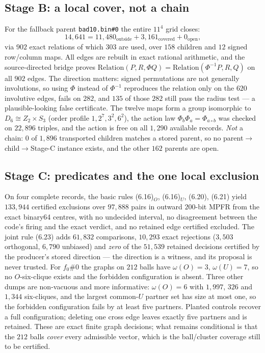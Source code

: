 \documentclass[10pt]{article}
\theoremstyle{definition}
\begin{document}
\subsection{Stage B: a local cover, not a chain}
For the fallback parent \texttt{bad10.bin\#0} the entire $11^4$ grid closes:
\[
14{,}641=11{,}480_{\text{outside}}+3{,}161_{\text{covered}}+0_{\text{open}} ,
\]
via $902$ exact relations of which $303$ are used, over $158$ children and $12$ signed row/column
maps. All edges are rebuilt in exact rational arithmetic, and the source-directed bridge proves
$\mathrm{Relation}(P,R,\Phi Q)=\mathrm{Relation}(\Phi^{-1}P,R,Q)$ on all $902$ edges. The direction
matters: signed permutations are not generally involutions, so using $\Phi$ instead of $\Phi^{-1}$
reproduces the relation only on the $620$ involutive edges, fails on $282$, and $135$ of those $282$
still pass the radius test --- a plausible-looking false certificate. The twelve maps form a group
isomorphic to $D_6\cong Z_2\times S_3$ (order profile $1,2^7,3^2,6^2$), the action law
$\Phi_b\Phi_a=\Phi_{a\circ b}$ was checked on $22{,}896$ triples, and the action is free on all
$1{,}290$ available records. \emph{Not} a chain: $0$ of $1{,}896$ transported children matches a stored
parent, so no parent$\to$child$\to$Stage-C instance exists, and the other $162$ parents are open.

\subsection{Stage C: predicates and the one local exclusion}
On four complete records, the basic rules (6.16)$_O$, (6.16)$_U$, (6.20), (6.21) yield $133{,}944$
certified exclusions over $97{,}888$ pairs in outward $200$-bit MPFR from the exact binary64
centres, with no undecided interval, no disagreement between the code's firing and the exact verdict,
and no retained edge certified excluded. The joint rule (6.23) adds $61{,}832$ comparisons,
$10{,}293$ exact rejections ($3{,}503$ orthogonal, $6{,}790$ unbiased) and \emph{zero} of the
$51{,}539$ retained decisions certified by the producer's stored direction --- the direction is a
witness, and its proposal is never trusted. For $f_0\#0$ the graphs on $212$ balls have
$\omega(O)=3$, $\omega(U)=7$, so no $O$-six-clique exists and the forbidden configuration is absent.
Three other dumps are non-vacuous and more informative: $\omega(O)=6$ with $1{,}997$, $326$ and
$1{,}344$ six-cliques, and the largest common-$U$ partner set has size at most one, so the forbidden
configuration fails by at least five partners. Planted controls recover a full configuration; deleting
one cross edge leaves exactly five partners and is retained. These are exact finite graph decisions;
what remains conditional is that the $212$ balls \emph{cover} every admissible vector, which is the
ball/cluster coverage still to be certified.
\end{document}
